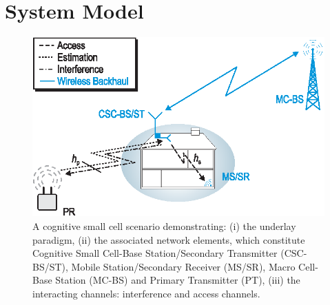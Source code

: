 \documentclass[letterpaper, twocolumn]{IEEEtran}
\newcommand{\figscalet}{0.76 \columnwidth}
\newcommand{\figscalet}{0.38 \columnwidth}
\begin{document}
\section{System Model} \label{sec:sys_mod}
\begin{figure}[!t]
\centering
\includegraphics[width = \figscalet]{figures/CR_Scenario_Underlay}
\caption{A cognitive small cell scenario demonstrating: (i) the underlay paradigm, (ii) the associated network elements, which constitute Cognitive Small Cell-Base Station/Secondary Transmitter (CSC-BS/ST), Mobile Station/Secondary Receiver (MS/SR), Macro Cell-Base Station (MC-BS) and Primary Transmitter (PT), (iii) the interacting channels: interference and access channels.}
\label{fig:scenario}
\end{figure}

\end{document}
